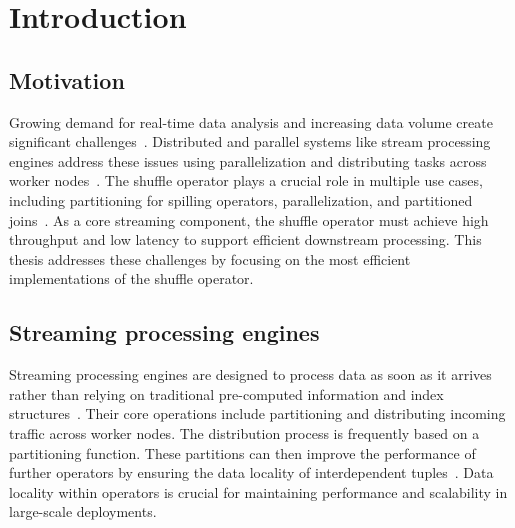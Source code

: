 
\chapter{Introduction}\label{chapter:introduction}\acresetall

\section{Motivation}
Growing demand for real-time data analysis and increasing data volume create significant challenges~\parencite{Real-Time-Processing-of-big-data-streams,locality-aware-partitioning-in-parallel-db, join-processing-in-parallel-db}.
Distributed and parallel systems like stream processing engines address these issues using parallelization and distributing tasks across worker nodes~\parencite{Real-Time-Processing-of-big-data-streams, parallel-programming-assessment-for-stream-processing-applications}.
The shuffle operator plays a crucial role in multiple use cases, including partitioning for spilling operators, parallelization, and partitioned joins~\parencite{Parallelism-exchange-in-parallel-db, RDMA-aware-Data-Shuffling-Operator}.
As a core streaming component, the shuffle operator must achieve high throughput and low latency to support efficient downstream processing.
This thesis addresses these challenges by focusing on the most efficient implementations of the shuffle operator.

\section{Streaming processing engines}
Streaming processing engines are designed to process data as soon as it arrives rather than relying on traditional pre-computed information and index structures~\parencite{Real-Time-Processing-of-big-data-streams}.
Their core operations include partitioning and distributing incoming traffic across worker nodes.
The distribution process is frequently based on a partitioning function.
These partitions can then improve the performance of further operators by ensuring the data locality of interdependent tuples~\parencite{Locality-sensitive-operators, join-processing-in-parallel-db}.
Data locality within operators is crucial for maintaining performance and scalability in large-scale deployments.

